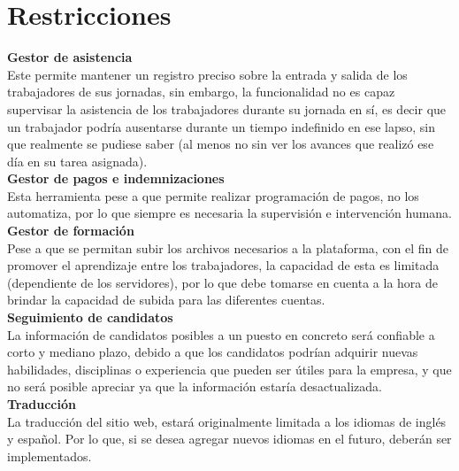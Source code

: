   \section{Restricciones}
  \noindent
  \textbf{Gestor de asistencia}
    \\ \newline
    Este permite mantener un registro preciso sobre la entrada y salida de los trabajadores de sus jornadas, sin embargo, la funcionalidad no es capaz supervisar la asistencia de los trabajadores durante su jornada en sí, es decir que un trabajador podría ausentarse durante un tiempo indefinido en ese lapso, sin que realmente se pudiese saber (al menos no sin ver los avances que realizó ese día en su tarea asignada).
    \\ \newline
    \textbf{Gestor de pagos e indemnizaciones}
    \\ \newline
    Esta herramienta pese a que permite realizar programación de pagos, no los automatiza, por lo que siempre es necesaria la supervisión e intervención humana.
    \\ \newline
    \textbf{Gestor de formación}
    \\ \newline
    Pese a que se permitan subir los archivos necesarios a la plataforma, con el fin de promover el aprendizaje entre los trabajadores, la capacidad de esta es limitada (dependiente de los servidores), por lo que debe tomarse en cuenta a la hora de brindar la capacidad de subida para las diferentes cuentas.
    \\ \newline
    \textbf{Seguimiento de candidatos}
    \\ \newline
    La información de candidatos posibles a un puesto en concreto será confiable a corto y mediano plazo, debido a que los candidatos podrían adquirir nuevas habilidades, disciplinas o experiencia que pueden ser útiles para la empresa, y que no será posible apreciar ya que la información estaría desactualizada.
    \\ \newline
    \textbf{Traducción}
    \\ \newline
    La traducción del sitio web, estará originalmente limitada a los idiomas de inglés y español. Por lo que, si se desea agregar nuevos idiomas en el futuro, deberán ser implementados. 

